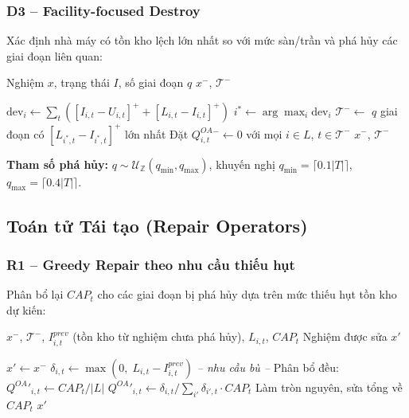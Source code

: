 \documentclass[12pt]{article}
\newcommand{\QOA}{Q^{OA}}
\newcommand{\pos}[1]{\left[#1\right]^+}
\begin{document}
\subsubsection*{D3 -- Facility-focused Destroy}

Xác định nhà máy có tồn kho lệch lớn nhất so với mức sàn/trần và phá hủy các giai đoạn liên quan:

\begin{algorithm}[H]
\caption{D3: Facility-focused Destroy}
\label{alg:d3}
\begin{algorithmic}[1]
\Require Nghiệm $x$, trạng thái $I$, số giai đoạn $q$
\Ensure $x^-$, $\mathcal{T}^-$

  \State $\text{dev}_i \gets \sum_t \left(\pos{I_{i,t} - U_{i,t}} + \pos{L_{i,t} - I_{i,t}}\right)$
\EndFor
\State $i^* \gets \arg\max_{i} \text{dev}_i$
\State $\mathcal{T}^- \gets$ $q$ giai đoạn có $\pos{L_{i^*,t}-I_{i^*,t}}$ lớn nhất
\State Đặt $\QOA_{i,t}^- \gets 0$ với mọi $i \in L$, $t \in \mathcal{T}^-$
\State \Return $x^-$, $\mathcal{T}^-$

\end{algorithmic}
\end{algorithm}

\noindent\textbf{Tham số phá hủy:} $q \sim \mathcal{U}_{\mathbb{Z}}(q_{\min}, q_{\max})$, khuyến nghị $q_{\min} = \lceil 0.1|T| \rceil$, $q_{\max} = \lceil 0.4|T| \rceil$.

\subsection{Toán tử Tái tạo (Repair Operators)}

\subsubsection*{R1 -- Greedy Repair theo nhu cầu thiếu hụt}

Phân bổ lại $CAP_t$ cho các giai đoạn bị phá hủy dựa trên mức thiếu hụt tồn kho dự kiến:

\begin{algorithm}[H]
\caption{R1: Greedy Demand-based Repair}
\label{alg:r1}
\begin{algorithmic}[1]
\Require $x^-$, $\mathcal{T}^-$, $I^{prev}_{i,t}$ (tồn kho từ nghiệm chưa phá hủy), $L_{i,t}$, $CAP_t$
\Ensure Nghiệm được sửa $x'$

\State $x' \gets x^-$
    \State $\delta_{i,t} \gets \max(0,\; L_{i,t} - I^{prev}_{i,t})$ \quad \textit{-- nhu cầu bù --}
  \EndFor
    \State Phân bổ đều: $\QOA'_{i,t} \gets CAP_t / |L|$
  \Else
    \State $\QOA'_{i,t} \gets \delta_{i,t} / \sum_{i'} \delta_{i',t} \cdot CAP_t$
  \EndIf
  \State Làm tròn nguyên, sửa tổng về $CAP_t$
\EndFor
\State \Return $x'$

\end{algorithmic}
\end{algorithm}
\end{document}
